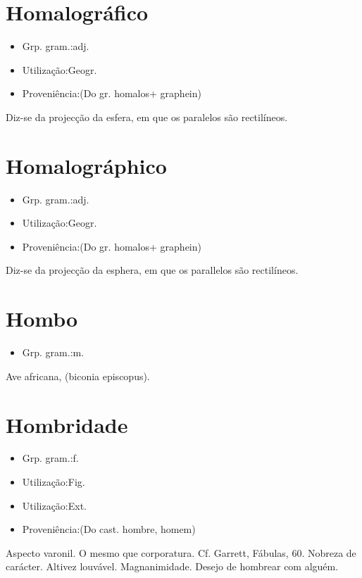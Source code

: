 \documentclass{article}
\begin{document}
\section{Homalográfico}
\begin{itemize}
\item {Grp. gram.:adj.}
\end{itemize}
\begin{itemize}
\item {Utilização:Geogr.}
\end{itemize}
\begin{itemize}
\item {Proveniência:(Do gr. \textunderscore homalos\textunderscore  + \textunderscore graphein\textunderscore )}
\end{itemize}
Diz-se da projecção da esfera, em que os paralelos são rectilíneos.
\section{Homalográphico}
\begin{itemize}
\item {Grp. gram.:adj.}
\end{itemize}
\begin{itemize}
\item {Utilização:Geogr.}
\end{itemize}
\begin{itemize}
\item {Proveniência:(Do gr. \textunderscore homalos\textunderscore  + \textunderscore graphein\textunderscore )}
\end{itemize}
Diz-se da projecção da esphera, em que os parallelos são rectilíneos.
\section{Hombo}
\begin{itemize}
\item {Grp. gram.:m.}
\end{itemize}
Ave africana, (\textunderscore biconia episcopus\textunderscore ).
\section{Hombridade}
\begin{itemize}
\item {Grp. gram.:f.}
\end{itemize}
\begin{itemize}
\item {Utilização:Fig.}
\end{itemize}
\begin{itemize}
\item {Utilização:Ext.}
\end{itemize}
\begin{itemize}
\item {Proveniência:(Do cast. \textunderscore hombre\textunderscore , homem)}
\end{itemize}
Aspecto varonil.
O mesmo que \textunderscore corporatura\textunderscore . Cf. Garrett, \textunderscore Fábulas\textunderscore , 60.
Nobreza de carácter.
Altivez louvável.
Magnanimidade.
Desejo de hombrear com alguém.
\end{document}
